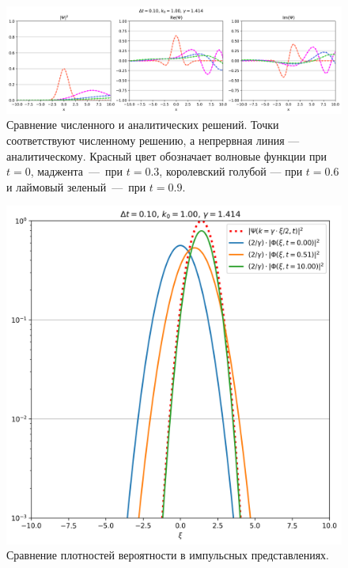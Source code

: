 \documentclass[10pt]{article}
\begin{document}
\begin{figure}[htbp]
 \centering
 \includegraphics[width=\textwidth]{../figures/comparison.png}
 \caption{Сравнение численного и аналитических решений. Точки соответствуют численному решению, а непрервная линия --- аналитическому. Красный цвет обозначает волновые функции при $t=0$, маджента~---~при $t=0.3$, королевский голубой --- при $t=0.6$ и лаймовый зеленый~---~при $t=0.9$. }
 \label{fig:1}
\end{figure}

\begin{figure}[htbp]
	\centering
	\includegraphics[width=\textwidth]{../figures/comparison_xi.png}
	\caption{Сравнение плотностей вероятности в импульсных представлениях.}
	\label{fig:2}
\end{figure}



 

\end{document}
